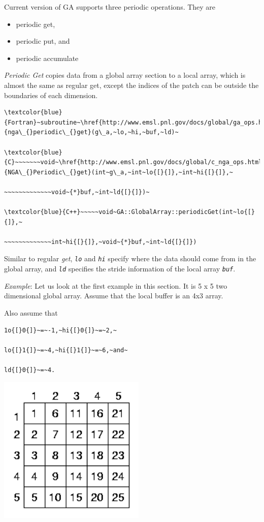 Current version of GA supports three periodic operations. They are
\begin{itemize}
\item periodic get, 
\item periodic put, and 
\item periodic accumulate
\end{itemize}
\emph{Periodic Get }copies data from a global array section to a local
array, which is almost the same as regular get, except the indices
of the patch can be outside the boundaries of each dimension.
\begin{verbatim}
\textcolor{blue}{Fortran}~subroutine~\href{http://www.emsl.pnl.gov/docs/global/ga_ops.html\#ga_periodic_get}{nga\_{}periodic\_{}get}(g\_a,~lo,~hi,~buf,~ld)~

\textcolor{blue}{C}~~~~~~~void~\href{http://www.emsl.pnl.gov/docs/global/c_nga_ops.html\#ga_periodic_get}{NGA\_{}Periodic\_{}get}(int~g\_a,~int~lo{[}{]},~int~hi{[}{]},~

~~~~~~~~~~~~~void~{*}buf,~int~ld{[}{]})~

\textcolor{blue}{C++}~~~~~void~GA::GlobalArray::periodicGet(int~lo{[}{]},~

~~~~~~~~~~~~~int~hi{[}{]},~void~{*}buf,~int~ld{[}{]})
\end{verbatim}
Similar to regular \emph{get}, \texttt{\emph{lo}} and \texttt{\emph{hi}}
specify where the data should come from in the global array, and \texttt{\emph{ld}}
specifies the stride information of the local array \texttt{\emph{buf}}.

\emph{Example}: Let us look at the first example in this section.
It is 5 x 5 two dimensional global array. Assume that the local buffer
is an 4x3 array. 

Also assume that
\begin{verbatim}
1o{[}0{]}~=~-1,~hi{[}0{]}~=~2,~

lo{[}1{]}~=~4,~hi{[}1{]}~=~6,~and~

ld{[}0{]}~=~4.
\end{verbatim}
\includegraphics[width=7cm]{periodic1}

